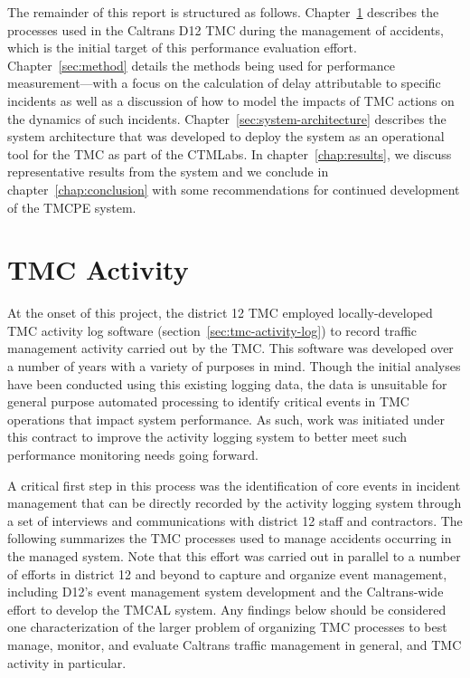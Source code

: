 \documentclass[12pt]{report}
\begin{document}
The remainder of this report is structured as follows.
Chapter~\ref{chap:tmc-activity} describes the processes used in the Caltrans
\ac{D12} \ac{TMC} during the management of accidents, which is the initial
target of this performance evaluation effort.  Chapter~\ref{sec:method} details
the methods being used for performance measurement---with a focus on the
calculation of delay attributable to specific incidents as well as a discussion
of how to model the impacts of \ac{TMC} actions on the dynamics of such
incidents.
Chapter~\ref{sec:system-architecture} describes the system architecture that was
developed to deploy the system as an operational tool for the \ac{TMC} as part
of the \ac{CTMLabs}.  In chapter~\ref{chap:results}, we discuss representative
results from the system and we conclude in chapter~\ref{chap:conclusion} with
some recommendations for continued development of the \ac{TMCPE} system.

\chapter{TMC Activity}
\label{chap:tmc-activity}

At the onset of this project, the district 12 \ac{TMC} employed
locally-developed \ac{TMC} activity log software
(section~\ref{sec:tmc-activity-log}) to record traffic management activity
carried out by the \ac{TMC}.  This software was developed over a number of years
with a variety of purposes in mind.  Though the initial analyses have been
conducted using this existing logging data, the data is unsuitable for general
purpose automated processing to identify critical events in \ac{TMC} operations
that impact system performance.  As such, work was initiated under this contract
to improve the activity logging system to better meet such performance
monitoring needs going forward.

A critical first step in this process was the identification of core events in
incident management that can be directly recorded by the activity logging system
through a set of interviews and communications with district 12 staff and
contractors.  The following summarizes the \ac{TMC} processes used to manage
accidents occurring in the managed system.  Note that this effort was carried
out in parallel to a number of efforts in district 12 and beyond to capture and
organize event management, including \acs{D12}'s event management system
development and the Caltrans-wide effort to develop the \ac{TMCAL} system.  Any
findings below should be considered one characterization of the larger problem
of organizing \ac{TMC} processes to best manage, monitor, and evaluate Caltrans
traffic management in general, and \ac{TMC} activity in particular.
\end{document}
